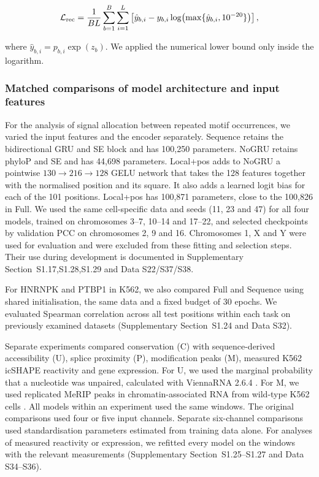\documentclass[webpdf,contemporary,large]{current_assets/oup-authoring-template}
\newcommand{\supsect}[1]{Supplementary Section~#1}
\begin{document}
\begin{equation}
\mathcal L_{\rm rec}=\frac1{BL}\sum_{b=1}^{B}\sum_{i=1}^{L}
\left[\hat y_{b,i}-y_{b,i}\log\!\left(\max\{\hat y_{b,i},10^{-20}\}\right)\right],
\label{eq:reconstruction_loss}
\end{equation}

where $\hat y_{b,i}=p_{b,i}\exp(z_b)$. We applied the numerical lower bound only inside the logarithm.

\subsubsection{Matched comparisons of model architecture and input features}

For the analysis of signal allocation between repeated motif occurrences, we varied the input features and the encoder separately. Sequence retains the bidirectional GRU and SE block and has 100,250 parameters. NoGRU retains phyloP and SE and has 44,698 parameters. Local+pos adds to NoGRU a pointwise $130\rightarrow216\rightarrow128$ GELU network that takes the 128 features together with the normalised position and its square. It also adds a learned logit bias for each of the 101 positions. Local+pos has 100,871 parameters, close to the 100,826 in Full. We used the same cell-specific data and seeds (11, 23 and 47) for all four models, trained on chromosomes 3--7, 10--14 and 17--22, and selected checkpoints by validation PCC on chromosomes 2, 9 and 16. Chromosomes 1, X and Y were used for evaluation and were excluded from these fitting and selection steps. Their use during development is documented in \supsect{S1.17,S1.28,S1.29} and Data S22/S37/S38.

For HNRNPK and PTBP1 in K562, we also compared Full and Sequence using shared initialisation, the same data and a fixed budget of 30 epochs. We evaluated Spearman correlation across all test positions within each task on previously examined datasets (\supsect{S1.24} and Data S32).

Separate experiments compared conservation (C) with sequence-derived accessibility (U), splice proximity (P), modification peaks (M), measured K562 icSHAPE reactivity and gene expression. For U, we used the marginal probability that a nucleotide was unpaired, calculated with ViennaRNA 2.6.4 \citep{lorenz2011vienna}. For M, we used replicated MeRIP peaks in chromatin-associated RNA from wild-type K562 cells \citep{dou2023rbfox2}. All models within an experiment used the same windows. The original comparisons used four or five input channels. Separate six-channel comparisons used standardisation parameters estimated from training data alone. For analyses of measured reactivity or expression, we refitted every model on the windows with the relevant measurements (\supsect{S1.25--S1.27} and Data S34--S36).
\end{document}

